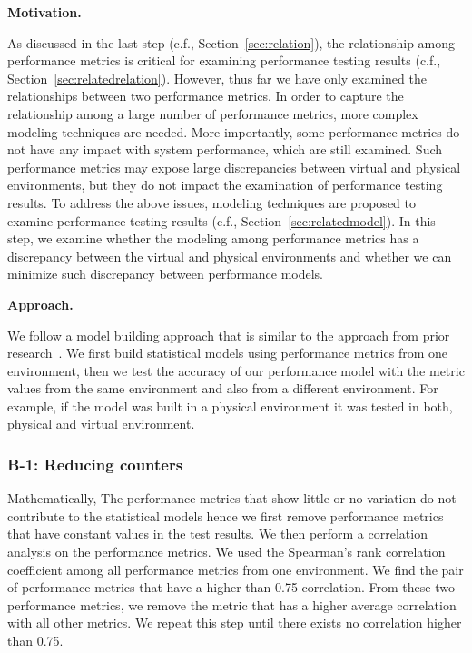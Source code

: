 \noindent \textbf{Motivation.}

As discussed in the last step (c.f., Section~\ref{sec:relation}), the relationship among performance metrics is critical for examining performance testing results (c.f., Section~\ref{sec:relatedrelation}). However, thus far we have only examined the relationships between two performance metrics. In order to capture the relationship among a large number of performance metrics,  more complex modeling techniques are needed. More importantly, some performance metrics do not have any impact with system performance, which are still examined. Such performance metrics may expose large discrepancies between virtual and physical environments, but they do not impact the examination of performance testing results. To address the above issues, modeling techniques are proposed to examine performance testing results (c.f., Section~\ref{sec:relatedmodel}). In this step, we examine whether the modeling among performance metrics has a discrepancy between the virtual and physical environments and whether we can minimize such discrepancy between performance models.


\noindent \textbf{Approach. }

We follow a model building approach that is similar to the approach from prior research~\cite{Shang:2015:ADP:2668930.2688052,Cohen:2005:CIC:1095810.1095821,xiong2013vperfguard}. We first build statistical models using performance metrics from one environment, then we test the accuracy of our performance model with the metric values from the same environment and also from a different environment. For example, if the model was built in a physical environment it was tested in both, physical and virtual environment.

\subsubsection{B-1: Reducing counters}

Mathematically, The performance metrics that show little or no variation do not contribute to the statistical models hence we first remove performance metrics that have constant values in the test results. We then perform a correlation analysis on the performance metrics. We used the Spearman's rank correlation coefficient among all performance metrics from one environment. We find the pair of performance metrics that have a higher than 0.75 correlation\cite{Syer2016}. From these two performance metrics, we remove the metric that has a higher average correlation with all other metrics. We repeat this step until there exists no correlation higher than 0.75.


